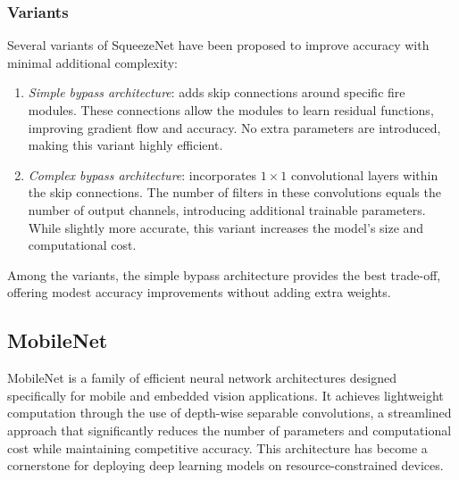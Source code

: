 \subsubsection{Variants}
Several variants of SqueezeNet have been proposed to improve accuracy with minimal additional complexity:
\begin{enumerate}
    \item \textit{Simple bypass architecture}: adds skip connections around specific fire modules.
        These connections allow the modules to learn residual functions, improving gradient flow and accuracy.
        No extra parameters are introduced, making this variant highly efficient.
    \item \textit{Complex bypass architecture}: incorporates $1 \times 1$ convolutional layers within the skip connections.
        The number of filters in these convolutions equals the number of output channels, introducing additional trainable parameters.
        While slightly more accurate, this variant increases the model's size and computational cost.
\end{enumerate}
\noindent Among the variants, the simple bypass architecture provides the best trade-off, offering modest accuracy improvements without adding extra weights.

\subsection{MobileNet}
MobileNet is a family of efficient neural network architectures designed specifically for mobile and embedded vision applications.
It achieves lightweight computation through the use of depth-wise separable convolutions, a streamlined approach that significantly reduces the number of parameters and computational cost while maintaining competitive accuracy.
This architecture has become a cornerstone for deploying deep learning models on resource-constrained devices.

